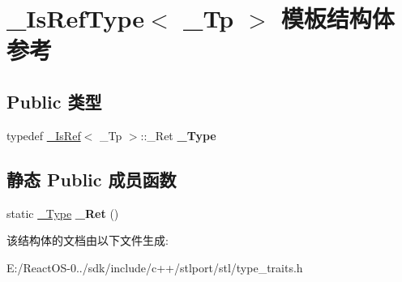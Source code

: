 \hypertarget{struct___is_ref_type}{}\section{\+\_\+\+Is\+Ref\+Type$<$ \+\_\+\+Tp $>$ 模板结构体 参考}
\label{struct___is_ref_type}
\subsection*{Public 类型}
\begin{DoxyCompactItemize}
\item 
\mbox{\label{struct___is_ref_type_a0d8b1a9632a325f82dfd86d48be2bdbd}} 
typedef \hyperlink{struct___is_ref}{\+\_\+\+Is\+Ref}$<$ \+\_\+\+Tp $>$\+::\+\_\+\+Ret {\bfseries \+\_\+\+Type}
\end{DoxyCompactItemize}
\subsection*{静态 Public 成员函数}
\begin{DoxyCompactItemize}
\item 
\mbox{\label{struct___is_ref_type_a2158788f976956f708a63ad3aad966f7}} 
static \hyperlink{struct____true__type}{\+\_\+\+Type} {\bfseries \+\_\+\+Ret} ()
\end{DoxyCompactItemize}


该结构体的文档由以下文件生成\+:\begin{DoxyCompactItemize}
\item 
E\+:/\+React\+O\+S-\/0../sdk/include/c++/stlport/stl/type\+\_\+traits.\+h\end{DoxyCompactItemize}
